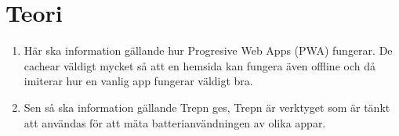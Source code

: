 \section{Teori}
\label{sec:joel_a-theory}

\begin{enumerate}
	\item Här ska information gällande hur Progresive Web Apps (PWA) fungerar. De cachear väldigt mycket så att en hemsida kan fungera även offline och då imiterar hur en vanlig app fungerar väldigt bra.
	\item  Sen så ska information gällande Trepn ges, Trepn är verktyget som är tänkt att användas för att mäta batterianvändningen av olika appar.
\end{enumerate}